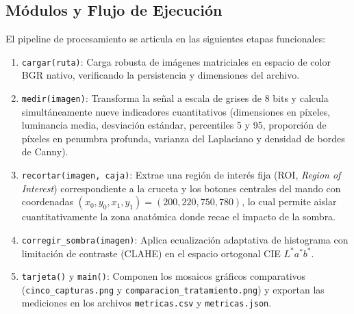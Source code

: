 \documentclass[12pt,letterpaper]{article}
\begin{document}
\subsection{M\'odulos y Flujo de Ejecuci\'on}
El pipeline de procesamiento se articula en las siguientes etapas funcionales:
\begin{enumerate}
    \item \texttt{cargar(ruta)}: Carga robusta de im\'agenes matriciales en espacio de color BGR nativo, verificando la persistencia y dimensiones del archivo.
    \item \texttt{medir(imagen)}: Transforma la se\~nal a escala de grises de 8 bits y calcula simult\'aneamente nueve indicadores cuantitativos (dimensiones en p\'ixeles, luminancia media, desviaci\'on est\'andar, percentiles 5 y 95, proporci\'on de p\'ixeles en penumbra profunda, varianza del Laplaciano y densidad de bordes de Canny).
    \item \texttt{recortar(imagen, caja)}: Extrae una regi\'on de inter\'es fija (ROI, \textit{Region of Interest}) correspondiente a la cruceta y los botones centrales del mando con coordenadas $(x_0, y_0, x_1, y_1) = (200, 220, 750, 780)$, lo cual permite aislar cuantitativamente la zona anat\'omica donde recae el impacto de la sombra.
    \item \texttt{corregir\_sombra(imagen)}: Aplica ecualizaci\'on adaptativa de histograma con limitaci\'on de contraste (CLAHE) en el espacio ortogonal CIE $L^*a^*b^*$.
    \item \texttt{tarjeta()} y \texttt{main()}: Componen los mosaicos gr\'aficos comparativos (\texttt{cinco\_capturas.png} y \texttt{comparacion\_tratamiento.png}) y exportan las mediciones en los archivos \texttt{metricas.csv} y \texttt{metricas.json}.
\end{enumerate}
\end{document}
